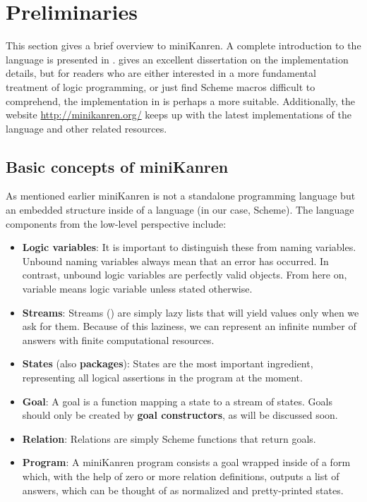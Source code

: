 \section{Preliminaries}
\label{prelim}
This section gives a brief overview to miniKanren.
A complete introduction to the language is presented in \textcite{reasoned}.
\textcite{byrdphd} gives an excellent dissertation on the implementation details, but for readers who are either interested in a more fundamental treatment of logic programming, or just find Scheme macros difficult to comprehend, the implementation in \textcite{micro} is perhaps a more suitable.
Additionally, the website \url{http://minikanren.org/} keeps up with the latest implementations of the language and other related resources.

\subsection{Basic concepts of miniKanren}
As mentioned earlier miniKanren is not a standalone programming language but an embedded structure inside of a language (in our case, Scheme). The language components from the low-level perspective include:
\begin{itemize}
\item \textbf{Logic variables}: It is important to distinguish these from naming variables. Unbound naming variables always mean that an error has occurred. In contrast, unbound logic variables are perfectly valid objects. From here on, variable means logic variable unless stated otherwise.
\item \textbf{Streams}: Streams (\cite{sicp}) are simply lazy lists that will yield values only when we ask for them. Because of this laziness, we can represent an infinite number of answers with finite computational resources.
\item \textbf{States} (also \textbf{packages}): States are the most important ingredient, representing all logical assertions in the program at the moment.
\item \textbf{Goal}: A goal is a function mapping a state to a stream of states. Goals should only be created by \textbf{goal constructors}, as will be discussed soon.
\item \textbf{Relation}: Relations are simply Scheme functions that return goals.
\item \textbf{Program}: A miniKanren program consists a goal wrapped inside of a  form which, with the help of zero or more relation definitions, outputs a list of answers, which can be thought of as normalized and pretty-printed states.
\end{itemize}

